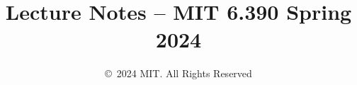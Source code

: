 \documentclass[10pt,oneside]{book}
\title{Lecture Notes -- MIT 6.390 Spring 2024}
\date{\copyright\ 2024 MIT. All Rights Reserved}
\begin{document}
\maketitle
\tableofcontents

\clearpage
















\begin{appendices}
    
    
    
    \printindex
    \clearpage
    \glsaddall
    \printglossaries
    \clearpage
\end{appendices}

%
%
%
%
%
\end{document}
